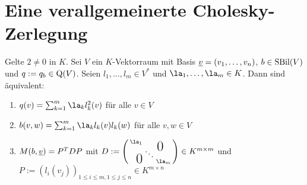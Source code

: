 \documentclass[../../main.tex]{subfiles}
\begin{document}
\section{Eine verallgemeinerte Cholesky-Zerlegung}

\begin{lem}\label{13.5.1}
Gelte $2\neq 0$ in $K$. Sei $V$ ein $K$-Vektorraum mit Basis ${\underline v}=(v_1,\ldots ,v_n)$, $b\in \operatorname{SBil}(V)$ und $q:=q_b\in \operatorname{Q}(V)$. Seien $l_1,\ldots ,l_m\in V^*$ und $\la_1,\ldots ,\la_m\in K$. Dann sind äquivalent:
\begin{enumerate}[\normalfont(a)]
\item $q(v)=\sum_{k=1}^m\la_k l_k^2(v)$ für alle $v\in V$
\item $b(v,w)=\sum_{k=1}^m\la_k l_k(v)l_k(w)$ für alle $v,w\in V$
\item $M(b,{\underline v})=P^TDP$ mit $D:=\left(\begin{smallmatrix}
\la_1 & & \llap{$\overset{\blap{\LARGE 0}}{~}$} \\
& \ddots &\\
\rlap{\tlap{\LARGE 0}} & & \la_m\end{smallmatrix}\right)\in K^{m\times m}$ und $P:=(l_i(v_j))_{1\le i\le m, 1\le j\le n}\in K^{m\times n}$
\end{enumerate}
\end{lem}
\end{document}
